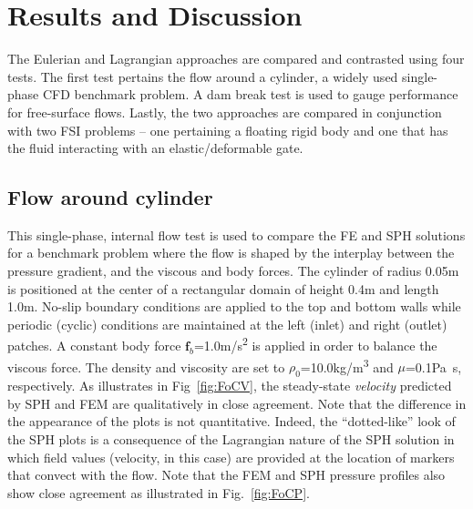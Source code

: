 \documentclass[final,3p,times]{elsarticle}
\begin{document}
\section{Results and Discussion}\label{sec:results}
The Eulerian and Lagrangian approaches are compared and contrasted using four tests. The first test pertains the flow around a cylinder, a widely used single-phase CFD benchmark problem. A dam break test is used to gauge performance for free-surface flows. Lastly, the two approaches are compared in conjunction with two FSI problems -- one pertaining a floating rigid body and one that has the fluid interacting with an elastic/deformable gate. 

\subsection{Flow around cylinder}
\label{subsec:flowAroundCylinder}
This single-phase, internal flow test is used to compare the FE and SPH solutions for a benchmark problem where the flow is shaped by the interplay between the pressure gradient, and the viscous and body forces. The cylinder of radius 0.05\si{m} is positioned at the center of a rectangular domain of height 0.4\si{m} and length 1.0\si{m}. No-slip boundary conditions are applied to the top and bottom walls while periodic (cyclic) conditions are maintained at the left (inlet) and right (outlet) patches. A constant body force $\mathbf{f}_b$=1.0\si{m/s^2} is applied in order to balance the viscous force. The density and viscosity are set to $\rho_0$=10.0\si{kg/m^3} and $\mu$=0.1\si{Pa.s}, respectively. As illustrates in Fig~\ref{fig:FoCV}, the steady-state {\textit{velocity}} predicted by SPH and FEM are qualitatively in close agreement. Note that the difference in the appearance of the plots is not quantitative. Indeed, the ``dotted-like'' look of the SPH plots is a consequence of the Lagrangian nature of the SPH solution in which field values (velocity, in this case) are provided at the location of markers that convect with the flow. Note that the FEM and SPH pressure profiles also show close agreement as illustrated in Fig.~\ref{fig:FoCP}.
\end{document}
